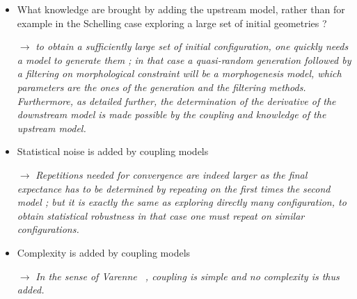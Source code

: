 \begin{itemize}
\item What knowledge are brought by adding the upstream model, rather than for example in the Schelling case exploring a large set of initial geometries ? 

$\rightarrow$ \textit{to obtain a sufficiently large set of initial configuration, one quickly needs a model to generate them ; in that case a quasi-random generation followed by a filtering on morphological constraint will be a morphogenesis model, which parameters are the ones of the generation and the filtering methods. Furthermore, as detailed further, the determination of the derivative of the downstream model is made possible by the coupling and knowledge of the upstream model.}
\item Statistical noise is added by coupling models

$\rightarrow$ \textit{Repetitions needed for convergence are indeed larger as the final expectance has to be determined by repeating on the first times the second model ; but it is exactly the same as exploring directly many configuration, to obtain statistical robustness in that case one must repeat on similar configurations.}

\item Complexity is added by coupling models

$\rightarrow$ \textit{In the sense of Varenne~\cite{varenne2010framework} , coupling is simple and no complexity is thus added.}
\end{itemize}
 



